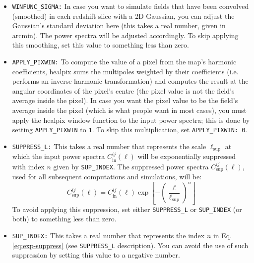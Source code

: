 \documentclass[12pt]{book} %
\newcommand{\nv}[1]{\mathrm{#1}}                 %
\begin{document}
\begin{itemize}
\item {\tt WINFUNC\_SIGMA:} In case you want to simulate fields that have been convolved 
  (smoothed) in each redshift slice with a 2D Gaussian, you can adjust the Gaussian's standard 
  deviation here (this takes a real number, given in arcmin). The power spectra will be adjusted accordingly. 
  To skip applying this smoothing, set this value to something less than zero.

\item {\tt APPLY\_PIXWIN:} To compute the value of a pixel from the map's harmonic coefficients, 
  {\sc healpix} sums the multipoles weighted by their coefficients (i.e. performs an inverse 
  harmonic transformation) and computes the result at the angular coordinates of the pixel's 
  centre (the pixel value is not the field's average inside the pixel). In case you want the pixel 
  value to be the field's average inside the pixel (which is what people want in most cases), 
  you must apply the {\sc healpix} window function 
  to the input power spectra; this is done by setting {\tt APPLY\_PIXWIN} to {\tt 1}. To skip 
  this multiplication, set {\tt APPLY\_PIXWIN: 0}.

\item {\tt SUPPRESS\_L:} This takes a real number that represents the scale $\ell_{\nv{sup}}$ 
  at which the input power spectra $C_{\nv{in}}^{ij}(\ell)$ will be exponentially suppressed 
  with index $n$ given by {\tt SUP\_INDEX}. The suppressed power spectra $C_{\nv{sup}}^{ij}(\ell)$, 
  used for all subsequent computations and simulations, will be: 
  \begin{equation}
    C_{\nv{sup}}^{ij}(\ell) = C_{\nv{in}}^{ij}(\ell) \exp \left[ - \left(\frac{\ell}{\ell_{\nv{sup}}}\right)^n\right]
    \label{eq:exp-suppress}
  \end{equation}
  To avoid applying this suppression, set either {\tt SUPPRESS\_L} or {\tt SUP\_INDEX} (or both) 
  to something less than zero.

\item {\tt SUP\_INDEX:} This takes a real number that represents the index $n$ in Eq. 
  \ref{eq:exp-suppress} (see {\tt SUPPRESS\_L} description). You can avoid the use 
  of such suppression by setting this value to a negative number.


\end{itemize}
\end{document}
